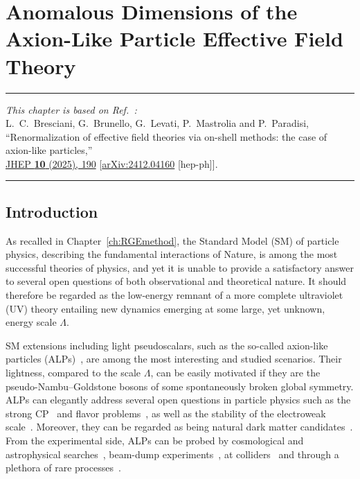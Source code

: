 \chapter{Anomalous Dimensions of the Axion-Like Particle Effective Field Theory}
\label{ch:ALP_RGEs}

\begin{flushright}
\small

{\color{chapterpaperrule}\rule{\textwidth}{0.5pt}}

\textit{This chapter is based on Ref.~\cite{Bresciani:2024shu}:}\\[0.5em]
L.~C.~Bresciani, G.~Brunello, G.~Levati, P.~Mastrolia and P.~Paradisi,\\
``Renormalization of effective field theories via on-shell methods: the case of axion-like particles,''\\
\href{https://doi.org/10.1007/JHEP10(2025)190}{JHEP \textbf{10} (2025), 190}
[\href{https://doi.org/10.48550/arXiv.2412.04160}{arXiv:2412.04160} [hep-ph]].

{\color{chapterpaperrule}\rule{\textwidth}{0.5pt}}
\end{flushright}

\section{Introduction}
As recalled in Chapter~\ref{ch:RGEmethod}, the Standard Model (SM) of particle physics, describing
the fundamental interactions of Nature, is among the most successful theories of physics, and yet it
is unable to provide a satisfactory answer to several open questions of both observational and
theoretical nature. It should therefore be regarded as the low-energy remnant of a more complete
ultraviolet (UV) theory entailing new dynamics emerging at some large, yet unknown, energy scale $\Lambda$.

SM extensions including light pseudoscalars, such as the so-called axion-like particles
(ALPs)~\cite{Jaeckel:2010ni,Marsh:2015xka,Irastorza:2018dyq,DiLuzio:2020wdo}, are among the most
interesting and studied scenarios. Their lightness, compared to the scale $\Lambda$, can be easily
motivated if they are the pseudo-Nambu--Goldstone bosons of some spontaneously broken global symmetry.
ALPs can elegantly address several open questions in particle physics such as the strong
CP~\cite{Peccei:1977hh,Peccei:1977ur,Weinberg:1977ma,Wilczek:1977pj} and flavor
problems~\cite{Davidson:1981zd,Wilczek:1982rv,Berezhiani:1989fp,Calibbi:2016hwq,Greljo:2024evt}, as
well as the stability of the electroweak scale~\cite{Graham:2015cka}. Moreover, they can be regarded
as being natural dark matter
candidates~\cite{Abbott:1982af,Preskill:1982cy,Dine:1982ah,Davis:1986xc}. From the experimental side,
ALPs can be probed by cosmological and astrophysical
searches~\cite{ADMX:2003rdr,Barbieri:2016vwg,Caldwell:2016dcw,Zioutas:1998cc,Irastorza:2011gs,%
CAST:2017uph,Armengaud:2014gea,VanBibber:1987rq,Bahre:2013ywa,OSQAR:2015qdv,Arvanitaki:2014dfa},
beam-dump experiments~\cite{Alekhin:2015byh,Dobrich:2015jyk,Shan:2024pcc}, at
colliders~\cite{Bauer:2017ris,Brivio:2017ije} and through a plethora of rare
processes~\cite{Bauer:2021mvw,Gavela:2019wzg,Cornella:2019uxs}.

